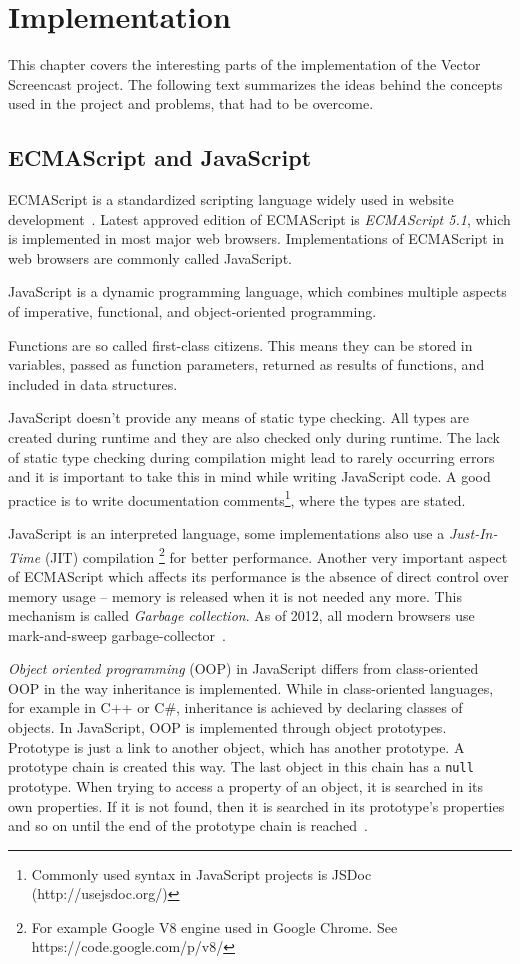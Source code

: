 \chapter{Implementation}
This chapter covers the interesting parts of the implementation of the Vector Screencast project. The following text summarizes the ideas behind the concepts used in the project and problems, that had to be overcome.

\section{ECMAScript and JavaScript}
ECMAScript is a standardized scripting language widely used in website development~\cite{ecmascript}. Latest approved edition of ECMAScript is \textit{ECMAScript 5.1}, which is implemented in most major web browsers. Implementations of ECMAScript in web browsers are commonly called JavaScript. 

JavaScript is a dynamic programming language, which combines multiple aspects of imperative, functional, and object-oriented programming.

Functions are so called first-class citizens. This means they can be stored in variables, passed as function parameters, returned as results of functions, and included in data structures.

JavaScript doesn't provide any means of static type checking. All types are created during runtime and they are also checked only during runtime. The lack of static type checking during compilation might lead to rarely occurring errors and it is important to take this in mind while writing JavaScript code. A good practice is to write documentation comments\footnote{Commonly used syntax in JavaScript projects is JSDoc (http://usejsdoc.org/)}, where the types are stated.

JavaScript is an interpreted language, some implementations also use a  \textit{Just-In-Time} (JIT) compilation \footnote{For example Google V8 engine used in Google Chrome. See https://code.google.com/p/v8/} for better performance.  Another very important aspect of ECMAScript which affects its performance is the absence of direct control over memory usage -- memory is released when it is not needed any more. This mechanism is called \textit{Garbage collection}. As of 2012, all modern browsers use mark-and-sweep garbage-collector~\cite{mdn_memory_management}.

\textit{Object oriented programming} (OOP) in JavaScript differs from class-oriented OOP in the way inheritance is implemented. While in class-oriented languages, for example in C++ or C\#, inheritance is achieved by declaring classes of objects. In JavaScript, OOP is implemented through object prototypes. Prototype is just a link to another object, which has another prototype. A prototype chain is created this way. The last object in this chain has a \verb|null| prototype. When trying to access a property of an object, it is searched in its own properties. If it is not found, then it is searched in its prototype's properties and so on until the end of the prototype chain is reached~\cite{mdn_prototype_chain}.


